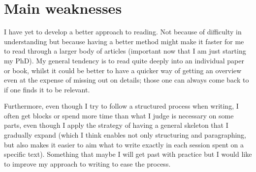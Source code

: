 
\section{Main weaknesses}
\label{sec:weaknesses}

I have yet to develop a better approach to reading.
 Not because of difficulty in understanding but because having a better
 method might make it faster for me to read through a larger body of articles
 (important now that I am just starting my PhD).
 My general tendency is to read quite deeply into an individual paper or
 book, whilst it could be better to have a quicker way of getting an overview
 even at the expense of missing out on details; those one can always come
 back to if one finds it to be relevant.

Furthermore, even though I try to follow a structured process when writing,
 I often get blocks or spend more time than what I judge is necessary on
 some parts, even though I apply the strategy of having a general skeleton
 that I gradually expand (which I think enables not only structuring and
 paragraphing, but also makes it easier to aim what to write exactly in
 each session spent on a specific text).
 Something that maybe I will get past with practice but I would like to
 improve my approach to writing to ease the process.


